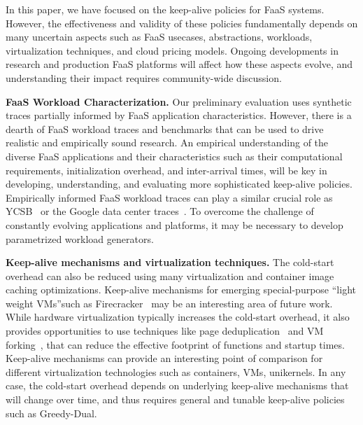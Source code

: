 
In this paper, we have focused on the keep-alive policies for FaaS systems.
%
However, the effectiveness and validity of these policies fundamentally depends on many uncertain aspects such as  FaaS usecases, abstractions, workloads, virtualization techniques, and cloud pricing models. 
%
Ongoing developments in research and production FaaS platforms will affect how these aspects evolve, and understanding their impact requires community-wide discussion. 



\noindent \textbf{FaaS Workload Characterization.}
Our preliminary evaluation uses synthetic traces partially informed by FaaS application characteristics. 
However, there is a dearth of FaaS workload traces and benchmarks that can be used to drive realistic and empirically sound research. 
An empirical understanding of the diverse FaaS applications and their characteristics such as their computational requirements, initialization overhead, and inter-arrival times, will be key in developing, understanding, and evaluating more sophisticated keep-alive policies. 
Empirically informed FaaS workload traces can play a similar crucial role as YCSB~\cite{ycsb-socc2010} or the Google data center traces~\cite{clusterdata:Reiss2011}. 
To overcome the challenge of constantly evolving applications and platforms, it may be necessary to develop parametrized workload generators. 



\noindent \textbf{Keep-alive mechanisms and virtualization techniques.}
The cold-start overhead can also be reduced using many virtualization and container image caching optimizations. 
Keep-alive mechanisms for emerging special-purpose ``light weight VMs''such as Firecracker~\cite{firecracker-nsdi20} may be an interesting area of future work. 
While hardware virtualization typically increases the cold-start overhead, it also provides opportunities to use techniques like page deduplication~\cite{sharma2012singleton} and VM forking~\cite{lagar2011snowflock}, that can reduce the effective footprint of functions and startup times.
Keep-alive mechanisms can provide an interesting point of comparison for different virtualization technologies such as containers, VMs, unikernels.
In any case, the cold-start overhead depends on underlying keep-alive mechanisms that will change over time, and thus requires general and tunable keep-alive policies such as Greedy-Dual. 




